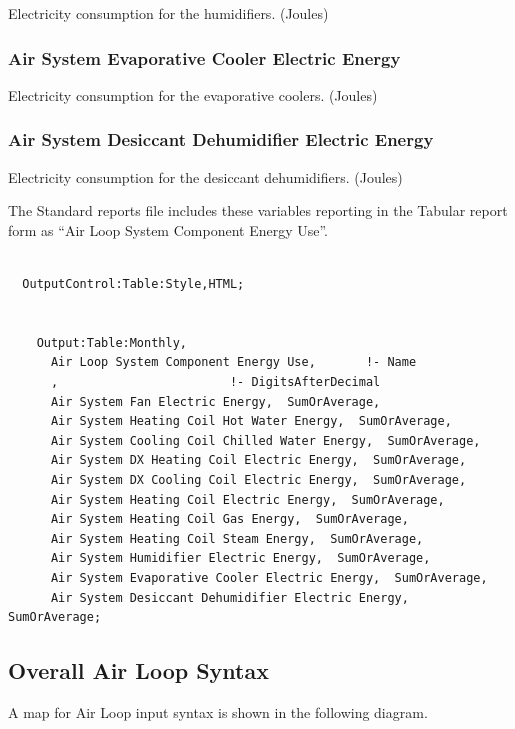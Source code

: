 Electricity consumption for the humidifiers. (Joules)

\subsubsection{Air System Evaporative Cooler Electric Energy}\label{air-system-evaporative-cooler-electric-energy}

Electricity consumption for the evaporative coolers. (Joules)

\subsubsection{Air System Desiccant Dehumidifier Electric Energy}\label{air-system-desiccant-dehumidifier-electric-energy}

Electricity consumption for the desiccant dehumidifiers. (Joules)

The Standard reports file includes these variables reporting in the Tabular report form as ``Air Loop System Component Energy Use''.

\begin{lstlisting}

  OutputControl:Table:Style,HTML;


    Output:Table:Monthly,
      Air Loop System Component Energy Use,       !- Name
      ,                        !- DigitsAfterDecimal
      Air System Fan Electric Energy,  SumOrAverage,
      Air System Heating Coil Hot Water Energy,  SumOrAverage,
      Air System Cooling Coil Chilled Water Energy,  SumOrAverage,
      Air System DX Heating Coil Electric Energy,  SumOrAverage,
      Air System DX Cooling Coil Electric Energy,  SumOrAverage,
      Air System Heating Coil Electric Energy,  SumOrAverage,
      Air System Heating Coil Gas Energy,  SumOrAverage,
      Air System Heating Coil Steam Energy,  SumOrAverage,
      Air System Humidifier Electric Energy,  SumOrAverage,
      Air System Evaporative Cooler Electric Energy,  SumOrAverage,
      Air System Desiccant Dehumidifier Electric Energy,  SumOrAverage;
\end{lstlisting}

\subsection{Overall Air Loop Syntax}\label{overall-air-loop-syntax}

A map for Air Loop input syntax is shown in the following diagram.

